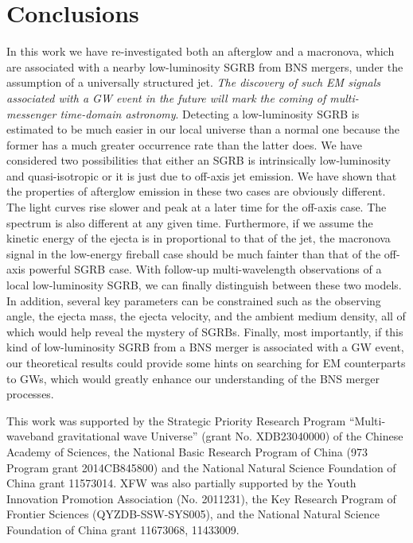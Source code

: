 \documentclass{emulateapj}
\begin{document}
{\section{Conclusions}
\label{sec:disc}
In this work we have re-investigated both an afterglow and a macronova, which are associated with a nearby low-luminosity SGRB from BNS mergers, under the assumption of a universally structured jet. {\em The discovery of such EM signals associated with a GW event in the future will mark the coming of multi-messenger time-domain astronomy}. Detecting a low-luminosity SGRB is estimated to be much easier in our local universe than a normal one because the former has a much greater occurrence rate than the latter does. We have considered two possibilities that either an SGRB is intrinsically low-luminosity and quasi-isotropic or it is just due to off-axis jet emission. We have shown that the properties of afterglow emission in these two cases are obviously different. The light curves rise slower and peak at a later time for the off-axis case. The spectrum is also different at any given time. Furthermore, if we assume the kinetic energy of the ejecta is in proportional to that of the jet, the macronova signal in the low-energy fireball case should be much fainter than that of the off-axis powerful SGRB case. With follow-up multi-wavelength observations of a local low-luminosity SGRB, we can finally distinguish between these two models. In addition, several key parameters can be constrained such as the observing angle, the ejecta mass, the ejecta velocity, and the ambient medium density, all of which would help reveal the mystery of SGRBs. Finally, most importantly, if this kind of low-luminosity SGRB from a BNS merger is associated with a GW event, our theoretical results could provide some hints on searching for EM counterparts to GWs, which would greatly enhance our understanding of the BNS merger processes.

\acknowledgements
This work was supported by the Strategic Priority Research Program ``Multi-waveband gravitational wave Universe'' (grant No. XDB23040000) of the Chinese Academy of Sciences, the National Basic Research Program of China (973 Program grant 2014CB845800) and the National Natural Science Foundation of China grant 11573014.  XFW was also partially supported by the Youth Innovation Promotion Association (No. 2011231), the Key Research Program of Frontier Sciences (QYZDB-SSW-SYS005), and the National Natural Science Foundation of China grant 11673068, 11433009.



}
\end{document}

